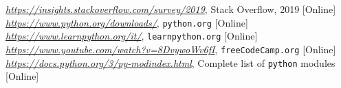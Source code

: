 %
%
\begin{thebibliography}{9}
 \href{https://insights.stackoverflow.com/survey/2019}{\emph{https://insights.stackoverflow.com/survey/2019}}, Stack Overflow, 2019 [Online]
 \href{https://www.python.org/downloads/}{\emph{https://www.python.org/downloads/}}, \texttt{python.org} [Online]
 \href{https://www.learnpython.org/it/}{\emph{https://www.learnpython.org/it/}}, \texttt{learnpython.org} [Online]
 \href{https://www.youtube.com/watch?v=8DvywoWv6fI}{\emph{https://www.youtube.com/watch?v=8DvywoWv6fI}}, \texttt{freeCodeCamp.org} [Online]
 \href{https://docs.python.org/3/py-modindex.html}{\emph{https://docs.python.org/3/py-modindex.html}}, Complete list of \texttt{python} modules [Online]
\end{thebibliography}
